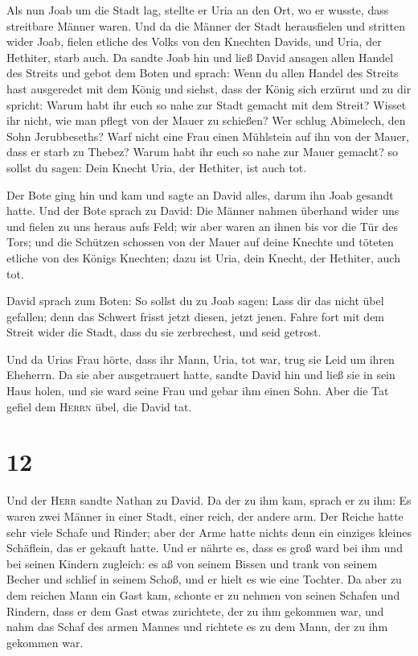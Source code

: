  Als nun Joab um die Stadt lag, stellte er Uria an den
Ort, wo er wusste, dass streitbare Männer waren.  Und da
die Männer der Stadt herausfielen und stritten wider Joab, fielen
etliche des Volks von den Knechten Davids, und Uria, der Hethiter, starb
auch.  Da sandte Joab hin und ließ David ansagen allen
Handel des Streits  und gebot dem Boten und sprach: Wenn
du allen Handel des Streits hast ausgeredet mit dem König
 und siehst, dass der König sich erzürnt und zu dir
spricht: Warum habt ihr euch so nahe zur Stadt gemacht mit dem Streit?
Wisset ihr nicht, wie man pflegt von der Mauer zu schießen?
 Wer schlug Abimelech, den Sohn Jerubbeseths? Warf nicht
eine Frau einen Mühlstein auf ihn von der Mauer, dass er starb zu
Thebez? Warum habt ihr euch so nahe zur Mauer gemacht? so sollst du
sagen: Dein Knecht Uria, der Hethiter, ist auch tot.

 Der Bote ging hin und kam und sagte an David alles,
darum ihn Joab gesandt hatte.  Und der Bote sprach zu
David: Die Männer nahmen überhand wider uns und fielen zu uns heraus
aufs Feld; wir aber waren an ihnen bis vor die Tür des Tors;
 und die Schützen schossen von der Mauer auf deine
Knechte und töteten etliche von des Königs Knechten; dazu ist Uria, dein
Knecht, der Hethiter, auch tot.

 David sprach zum Boten: So sollst du zu Joab sagen: Lass
dir das nicht übel gefallen; denn das Schwert frisst jetzt diesen, jetzt
jenen. Fahre fort mit dem Streit wider die Stadt, dass du sie
zerbrechest, und seid getrost.

 Und da Urias Frau hörte, dass ihr Mann, Uria, tot war,
trug sie Leid um ihren Eheherrn.  Da sie aber
ausgetrauert hatte, sandte David hin und ließ sie in sein Haus holen,
und sie ward seine Frau und gebar ihm einen Sohn. Aber die Tat gefiel
dem \textsc{Herrn} übel, die David tat.

\hypertarget{section-11}{%
\section{12}\label{section-11}}

 Und der \textsc{Herr} sandte Nathan zu David. Da der zu
ihm kam, sprach er zu ihm: Es waren zwei Männer in einer Stadt, einer
reich, der andere arm.  Der Reiche hatte sehr viele Schafe
und Rinder;  aber der Arme hatte nichts denn ein einziges
kleines Schäflein, das er gekauft hatte. Und er nährte es, dass es groß
ward bei ihm und bei seinen Kindern zugleich: es aß von seinem Bissen
und trank von seinem Becher und schlief in seinem Schoß, und er hielt es
wie eine Tochter.  Da aber zu dem reichen Mann ein Gast
kam, schonte er zu nehmen von seinen Schafen und Rindern, dass er dem
Gast etwas zurichtete, der zu ihm gekommen war, und nahm das Schaf des
armen Mannes und richtete es zu dem Mann, der zu ihm gekommen war.

